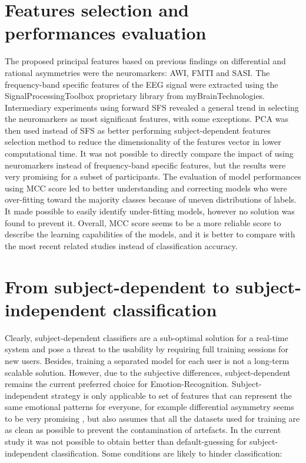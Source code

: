 \section{Features selection and performances evaluation}

The proposed principal features based on previous findings on differential and rational asymmetries were the neuromarkers: \ac{AWI}, \ac{FMTI} and \ac{SASI}. The frequency-band specific features of the \ac{EEG} signal were extracted using the SignalProcessingToolbox proprietary library from myBrainTechnologies. Intermediary experiments using forward \ac{SFS} revealed a general trend in selecting the neuromarkers as most significant features, with some exceptions. \ac{PCA} was then used instead of \ac{SFS} as better performing subject-dependent features selection method to reduce the dimensionality of the features vector in lower computational time. It was not possible to directly compare the impact of using neuromarkers instead of frequency-band specific features, but the results were very promising for a subset of participants. The evaluation of model performances using \ac{MCC} score led to better understanding and correcting models who were over-fitting toward the majority classes because of uneven distributions of labels. It made possible to easily identify under-fitting models, however no solution was found to prevent it. Overall, \ac{MCC} score seems to be a more reliable score to describe the learning capabilities of the models, and it is better to compare with the most recent related studies instead of classification accuracy.

\section{From subject-dependent to subject-independent classification}

Clearly, subject-dependent classifiers are a sub-optimal solution for a real-time system and pose a threat to the usability by requiring full training sessions for new users. Besides, training a separated model for each user is not a long-term scalable solution. However, due to the subjective differences, subject-dependent remains the current preferred choice for Emotion-Recognition. Subject-independent strategy is only applicable to set of features that can represent the same emotional patterns for everyone, for example differential asymmetry seems to be very promising \cite{lin_toward_2015}, but also assumes that all the datasets used for training are as clean as possible to prevent the contamination of artefacts. In the current study it was not possible to obtain better than default-guessing for subject-independent classification. Some conditions are likely to hinder classification:

